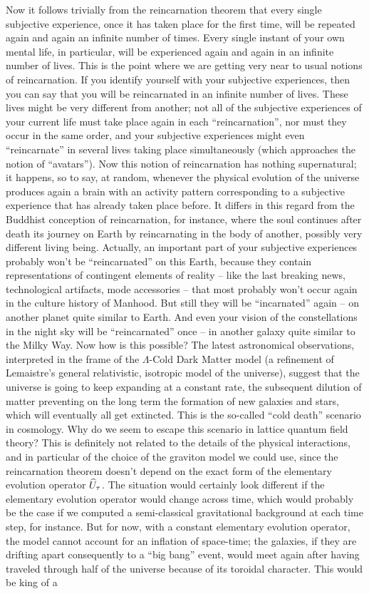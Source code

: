 Now it follows trivially from the reincarnation theorem that every single subjective experience, once it has taken place for the first time, will be repeated again and again an infinite number of times. Every single instant of your own mental life, in particular, will be experienced again and again in an infinite number of lives. This is the point where we are getting very near to usual notions of reincarnation. If you identify yourself with your subjective experiences, then you can say that you will be reincarnated in an infinite number of lives. These lives might be very different from another; not all of the subjective experiences of your current life must take place again in each ``reincarnation'', nor must they occur in the same order, and your subjective experiences might even ``reincarnate'' in several lives taking place simultaneously (which approaches the notion of ``avatars''). Now this notion of reincarnation has nothing supernatural; it happens, so to say, at random, whenever the physical evolution of the universe produces again a brain with an activity pattern corresponding to a subjective experience that has already taken place before. It differs in this regard from the Buddhist conception of reincarnation, for instance, where the soul continues after death its journey on Earth by reincarnating in the body of another, possibly very different living being. Actually, an important part of your subjective experiences probably won't be ``reincarnated'' on this Earth, because they contain representations of contingent elements of reality -- like the last breaking news, technological artifacts, mode accessories -- that most probably won't occur again in the culture history of Manhood. But still they will be ``incarnated'' again -- on another planet quite similar to Earth. And even your vision of the constellations in the night sky will be ``reincarnated'' once -- in another galaxy quite similar to the Milky Way. Now how is this possible? The latest astronomical observations, interpreted in the frame of the  $\Lambda$-Cold Dark Matter model (a refinement of Lemaistre's general relativistic, isotropic model of the universe), suggest that the universe is going to keep expanding at a constant rate, the subsequent dilution of matter preventing on the long term the formation of new galaxies and stars, which will eventually all get extincted. This is the so-called ``cold death'' scenario in cosmology. Why do we seem to escape this scenario in lattice quantum field theory? This is definitely not related to the details of the physical interactions, and in particular of the choice of the graviton model we could use, since the reincarnation theorem doesn't depend on the exact form of the elementary evolution operator $\widehat{U}_\tau$. The situation would certainly look different if the elementary evolution operator would change across time, which would probably be the case if we computed a semi-classical gravitational background at each time step, for instance. But for now, with a constant elementary evolution operator, the model cannot account for an inflation of space-time; the galaxies, if they are drifting apart consequently to a ``big bang'' event, would meet again after having traveled through half of the universe because of its toroidal character. This would be king of a 